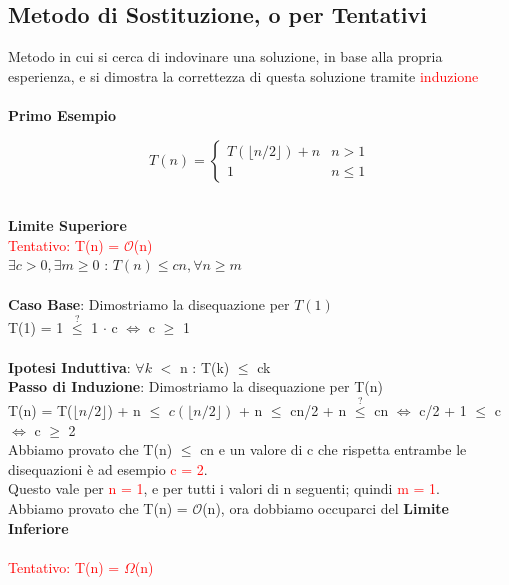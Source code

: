 \documentclass[../cheatSheetAlgoritmi.tex]{subfiles}
\begin{document}
\subsection{Metodo di Sostituzione, o per Tentativi}
Metodo in cui si cerca di indovinare una soluzione, in base alla propria esperienza, e si dimostra la correttezza di questa soluzione tramite \textcolor{red}{induzione}\\\\
\textbf{Primo Esempio}
\begin{center}
	\begin{equation*}
  		T(n)=\begin{cases}
    		T(\lfloor n/2 \rfloor) + n & \text{$n > 1$}\\
    		1 & \text{$n \leq 1$}
  		\end{cases}
	\end{equation*}
\end{center}
\hfill\\
\textbf{Limite Superiore}\\
\textcolor{red}{Tentativo: T(n) = $\mathcal{O}$(n)}\\
$\exists c > 0, \exists m \geq 0$ : $T(n) \leq cn, \forall n \geq m$\\\\
\textbf{Caso Base}: Dimostriamo la disequazione per $T(1)$\\
T(1) = 1 $\stackrel{?}{\leq}$ 1 $\cdot$ c $\iff$ c $\geq$ 1\\\\
\textbf{Ipotesi Induttiva}: $\forall k$ $<$ n : T(k) $\leq$ ck\\
\textbf{Passo di Induzione}: Dimostriamo la disequazione per T(n)\\
T(n) =  T($\lfloor n/2 \rfloor$) + n $\leq$ $c( \lfloor n/2 \rfloor)$ + n $\leq$ cn/2 + n $\stackrel{?}{\leq}$ cn $\iff$  c/2 + 1 $\leq$ c\\
$\iff$ c $\geq$ 2\\
Abbiamo provato che T(n) $\leq$ cn e un valore di c che rispetta entrambe le disequazioni è ad esempio \textcolor{red}{c = 2}.\\
Questo vale per \textcolor{red}{n = 1}, e per tutti i valori di n seguenti; quindi \textcolor{red}{m = 1}.\\
Abbiamo provato che T(n) = $\mathcal{O}$(n), ora dobbiamo occuparci del \textbf{Limite Inferiore}\\\\
\textcolor{red}{Tentativo: T(n) = $\Omega$(n)}\\
\end{document}
